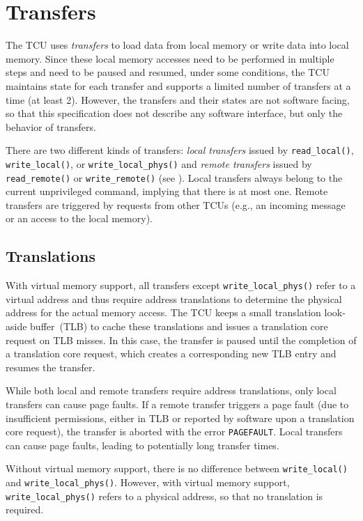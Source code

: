 \chapter{Transfers}

The TCU uses \emph{transfers} to load data from local memory or write data into local memory. Since
these local memory accesses need to be performed in multiple steps and need to be paused and
resumed\colorbox{pemux}{, under some conditions,} the TCU maintains state for each transfer and
supports a limited number of transfers at a time (at least 2). However, the transfers and their
states are not software facing, so that this specification does not describe any software interface,
but only the behavior of transfers.

There are two different kinds of transfers: \emph{local transfers} issued by \texttt{read\_local()},
\texttt{write\_local()}, or \texttt{write\_local\_phys()} and \emph{remote transfers} issued by
\texttt{read\_remote()} or \texttt{write\_remote()} (see ). Local
transfers always belong to the current unprivileged command, implying that there is at most one.
Remote transfers are triggered by requests from other TCUs (e.g., an incoming message or an access
to the local memory).

\cbstart
\section{Translations}

With virtual memory support, all transfers except \texttt{write\_local\_phys()} refer to a virtual
address and thus require address translations to determine the physical address for the actual
memory access. The TCU keeps a small translation look-aside buffer~(TLB) to cache these translations
and issues a translation core request on TLB misses. In this case, the transfer is paused until the
completion of a translation core request, which creates a corresponding new TLB entry and resumes
the transfer.

While both local and remote transfers require address translations, only local transfers can cause
page faults. If a remote transfer triggers a page fault (due to insufficient permissions, either in
TLB or reported by software upon a translation core request), the transfer is aborted with the error
\texttt{PAGEFAULT}. Local transfers can cause page faults, leading to potentially long transfer
times.

Without virtual memory support, there is no difference between \texttt{write\_local()} and
\texttt{write\_local\_phys()}. However, with virtual memory support, \texttt{write\_local\_phys()}
refers to a physical address, so that no translation is required.

